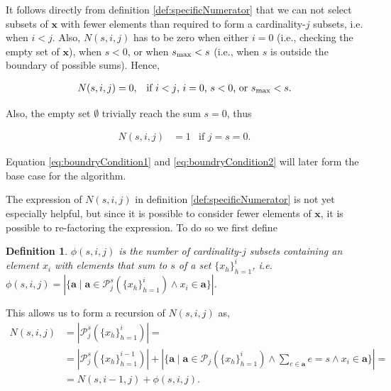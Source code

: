 \documentclass[a4paper]{article}
\newtheorem{mydef}{Definition}
\begin{document}
It follows directly from definition \ref{def:specificNumerator} that we can not select subsets of $\bm{x}$ with fewer elements than required to form a cardinality-$j$ subsets, i.e. when $i<j$. Also, $N(s,i,j)$ has to be zero when either $i=0$ (i.e., checking the empty set of $\bm{x}$), when $s < 0$, or when $s_{\rm max} < s$ (i.e., when $s$ is outside the boundary of possible sums). Hence, 

\begin{align}
\label{eq:boundryCondition1}
N(s,i,j) &=0, & \text{if $i < j$, $i=0$, $s < 0$, or $s_{\rm max} < s$.}
\end{align}

Also, the empty set $\emptyset$ trivially reach the sum $s=0$, thus

\begin{align}
\label{eq:boundryCondition2}
N(s,i,j) &= 1 & \text{if $j=s=0$.}
\end{align}

Equation \ref{eq:boundryCondition1} and \ref{eq:boundryCondition2} will later form the base case for the algorithm.

The expression of $N(s,i,j)$ in definition \ref{def:specificNumerator} is not yet especially helpful, but since it is possible to consider fewer elements of $\bm{x}$, it is possible to re-factoring the expression. To do so we first define 
\begin{mydef}
\label{def:specificNumerator2}
$\phi (s,i,j)$ is the number of cardinality-$j$ subsets containing an element $x_i$ with elements that sum to $s$ of a set $\{ x_h \}^i_{h=1}$, i.e. $\phi (s,i,j)=|\{ \bm{a} \mid \bm{a}\in \mathcal{P}^s_j(\{ x_h \}^i_{h=1}) \land x_i \in \bm{a} \}|$.\end{mydef}


This allows us to form a recursion of $N(s,i,j)$ as,
\begin{align}
\label{eq:recursion1}
N(s,i,j) &= |\mathcal{P}^s_j(\{ x_h \}^i_{h=1})| = \\
    &= |\mathcal{P}^s_j(\{ x_h \}^{i-1}_{h=1})| 
    + |\{ \bm{a} \mid \bm{a}\in \mathcal{P}_j(\{ x_h \}^i_{h=1}) \land \sum_{e \in \bm{a}}e=s \land x_i \in \bm{a} \}| = \\
    &= N(s,i-1,j)+ \phi (s,i,j).
\end{align}
\end{document}
